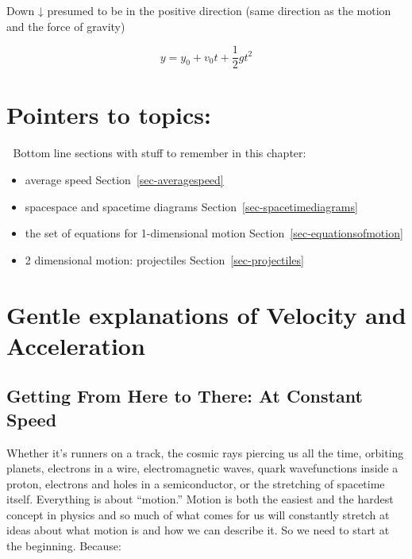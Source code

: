 \documentclass[
  letterpaper,
  DIV=11,
  numbers=noendperiod,
  oneside]{scrreprt}
\begin{document}
Down ↓ presumed to be in the positive direction (same direction as the
motion and the force of gravity)

\[
y = y_0 + v_0t + \dfrac{1}{2} gt^2
\]

\section{Pointers to topics:}\label{pointers-to-topics}

\begin{tcolorbox}[enhanced jigsaw, colbacktitle=quarto-callout-tip-color!10!white, rightrule=.15mm, toptitle=1mm, arc=.35mm, breakable, left=2mm, title={Tip}, colframe=quarto-callout-tip-color-frame, bottomrule=.15mm, colback=white, titlerule=0mm, leftrule=.75mm, toprule=.15mm, coltitle=black, opacityback=0, opacitybacktitle=0.6, bottomtitle=1mm]

🔐 Bottom line sections with stuff to remember in this chapter:

\begin{itemize}
\item
  average speed Section~\ref{sec-averagespeed}
\item
  spacespace and spacetime diagrams Section~\ref{sec-spacetimediagrams}
\item
  the set of equations for 1-dimensional motion
  Section~\ref{sec-equationsofmotion}
\item
  2 dimensional motion: projectiles Section~\ref{sec-projectiles}
\end{itemize}

\end{tcolorbox}

\section{Gentle explanations of Velocity and
Acceleration}\label{gentle-explanations-of-velocity-and-acceleration}

\subsection{Getting From Here to There: At Constant
Speed}\label{getting-from-here-to-there-at-constant-speed}

Whether it's runners on a track, the cosmic rays piercing us all the
time, orbiting planets, electrons in a wire, electromagnetic waves,
quark wavefunctions inside a proton, electrons and holes in a
semiconductor, or the stretching of spacetime itself. Everything is
about ``motion.'' Motion is both the easiest and the hardest concept in
physics and so much of what comes for us will constantly stretch at
ideas about what motion is and how we can describe it. So we need to
start at the beginning. Because:
\end{document}
